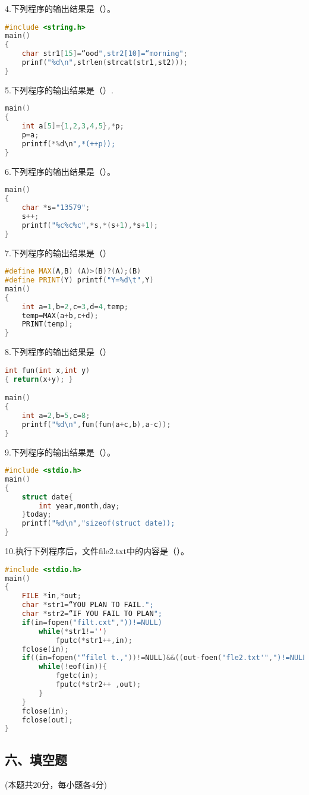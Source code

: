 4.下列程序的输出结果是（）。
\begin{lstlisting}[language=cpp]
#include <string.h>
main()
{
    char str1[15]=“ood",str2[10]=“morning";
    prinf("%d\n",strlen(strcat(str1,st2)));
}
\end{lstlisting}

5.下列程序的输出结果是（）.
\begin{lstlisting}[language=cpp]
main()
{
    int a[5]={1,2,3,4,5},*p;
    p=a;
    printf(*%d\n",*(++p));
}
\end{lstlisting}

6.下列程序的输出结果是（）。
\begin{lstlisting}[language=cpp]
main()
{
    char *s="13579";
    s++;
    printf("%c%c%c",*s,*(s+1),*s+1);
}
\end{lstlisting}

7.下列程序的输出结果是（）
\begin{lstlisting}[language=cpp]
#define MAX(A,B) (A)>(B)?(A);(B)
#define PRINT(Y) printf("Y=%d\t",Y)
main()
{
    int a=1,b=2,c=3,d=4,temp;
    temp=MAX(a+b,c+d);
    PRINT(temp);
}
\end{lstlisting}

8.下列程序的输出结果是（）
\begin{lstlisting}[language=cpp]
int fun(int x,int y)
{ return(x+y); }

main()
{
    int a=2,b=5,c=8;
    printf("%d\n",fun(fun(a+c,b),a-c));
}
\end{lstlisting}

9.下列程序的输出结果是（）。
\begin{lstlisting}[language=cpp]
#include <stdio.h>
main()
{
    struct date{
        int year,month,day;
    }today;
    printf("%d\n","sizeof(struct date));
}
\end{lstlisting}

10.执行下列程序后，文件file2.txt中的内容是（）。
\begin{lstlisting}[language=cpp]
#include <stdio.h>
main()
{
    FILE *in,*out;
    char *str1=“YOU PLAN TO FAIL.";
    char *str2=“IF YOU FAIL TO PLAN";
    if(in=fopen("filt.cxt","))!=NULL)
        while(*str1!='')
            fputc(*str1++,in);
    fclose(in);
    if((in=fopen("“filel t.,"))!=NULL)&&((out-foen("fle2.txt'",")!=NULL){
        while(!eof(in)){
            fgetc(in);
            fputc(*str2++ ,out);
        }
    }
    fclose(in);
    fclose(out);
}
\end{lstlisting}

\subsection{六、填空题}
(本题共20分，每小题各4分)

